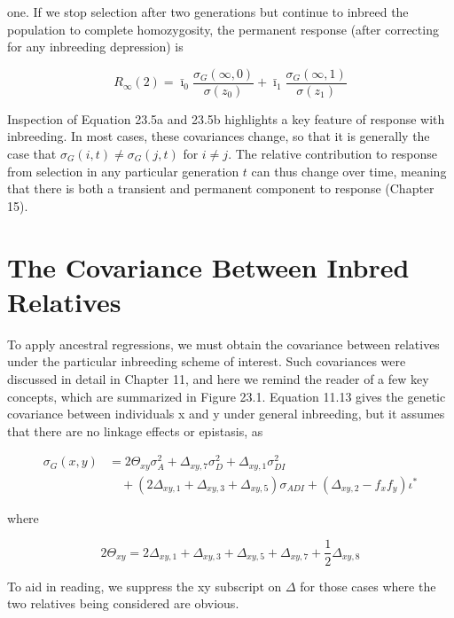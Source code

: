 \documentclass{article}
\begin{document}
one. If we stop selection after two generations but continue to inbreed the population to complete homozygosity, the permanent response (after correcting for any inbreeding depression) is

\begin{equation}
R_{\infty}(2)=\bar{\imath}_{0}\frac{\sigma_{G}(\infty,0)}{\sigma(z_{0})}+\bar{\imath}_{1}\frac{\sigma_{G}(\infty,1)}{\sigma(z_{1})}
\tag{23.5b}
\label{eq:23_5b}
\end{equation}

Inspection of Equation 23.5a and 23.5b highlights a key feature of response with inbreeding. In most cases, these covariances change, so that it is generally the case that  $ \sigma_G(i,t) \neq \sigma_G(j,t) $ for  $ i \neq j $. The relative contribution to response from selection in any particular generation  $ t $ can thus change over time, meaning that there is both a transient and permanent component to response (Chapter 15).

\section{The Covariance Between Inbred Relatives}
To apply ancestral regressions, we must obtain the covariance between relatives under the particular inbreeding scheme of interest. Such covariances were discussed in detail in Chapter 11, and here we remind the reader of a few key concepts, which are summarized in Figure 23.1. Equation 11.13 gives the genetic covariance between individuals x and y under general inbreeding, but it assumes that there are no linkage effects or epistasis, as

\begin{equation}
\begin{aligned}\sigma_{G}(x,y)&=2\Theta_{xy}\sigma_{A}^{2}+\Delta_{xy,7}\sigma_{D}^{2}+\Delta_{xy,1}\sigma_{DI}^{2}\\&\quad+(2\Delta_{xy,1}+\Delta_{xy,3}+\Delta_{xy,5})\sigma_{ADI}+(\Delta_{xy,2}-f_{x}f_{y})\iota^{*}\end{aligned}
\tag{23.6a}
\label{eq:23_6a}
\end{equation}

where

\begin{equation}
2\Theta_{x y}=2\Delta_{x y,1}+\Delta_{x y,3}+\Delta_{x y,5}+\Delta_{x y,7}+\frac{1}{2}\Delta_{x y,8}
\tag{23.6b}
\label{eq:23_6b}
\end{equation}

To aid in reading, we suppress the xy subscript on  $ \Delta $ for those cases where the two relatives being considered are obvious.
\end{document}
